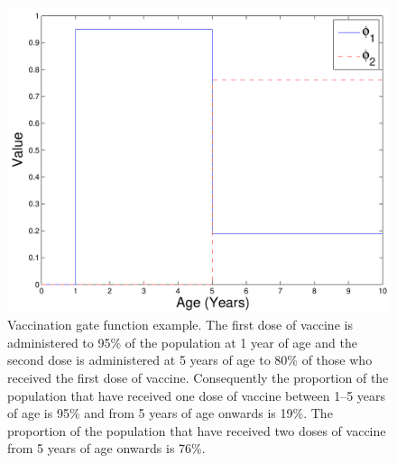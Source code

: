 \documentclass[a4paper,11pt] {scrartcl}
\begin{document}
\begin{figure}[hp]
\centering
\includegraphics[width=120mm]{gatefunctionexample}
\caption{Vaccination gate function example. The first dose of vaccine is administered to 95\% of the population at 1 year of age and the second dose is administered at 5 years of age to 80\% of those who received the first dose of vaccine. Consequently the proportion of the population that have received one dose of vaccine between 1--5 years of age is 95\% and from 5 years of age onwards is 19\%. The proportion of the population that have received two doses of vaccine from 5 years of age onwards is 76\%.}
\label{fig:establishingparametersgatefunctionexample}
\end{figure}

\singlespacing
\end{document}

